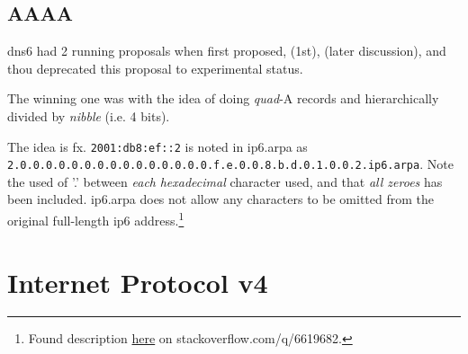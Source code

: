 \subsection{AAAA}

\gls{dns6} had 2 running proposals when first proposed,  (1st),  (later discussion), and  thou deprecated this proposal to experimental status.

The winning one was  with the idea of doing \textit{quad}-A records and hierarchically divided by \textit{nibble} {\small (i.e. 4 bits)}.

The idea is fx. \texttt{2001:db8:ef::2} is noted in ip6.arpa as \texttt{2.0.0.0.0.0.0.0.0.0.0.0.0.0.0.0.f.e.0.0.8.b.d.0.1.0.0.2.ip6.arpa}. {\small Note the used of '.' between \textit{each} \textit{hexadecimal} character used, and that \textit{all zeroes} has been included. ip6.arpa does not allow any characters to be omitted from the original full-length \gls{ip6} address.}\footnote{Found description \href{https://stackoverflow.com/q/6619682}{here} on stackoverflow.com/q/6619682.}

\section[IPv4]{Internet Protocol v4}